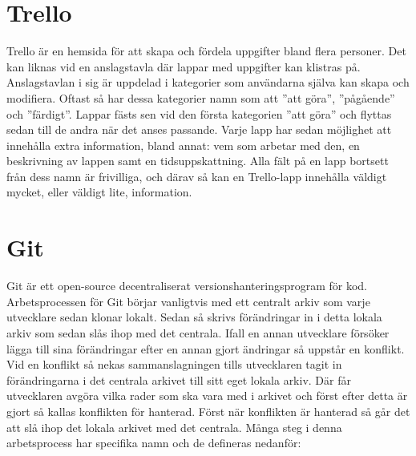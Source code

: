 \section{Trello}
Trello är en hemsida för att skapa och fördela uppgifter bland flera personer.\cite{Trello} Det kan liknas vid en anslagstavla där lappar med uppgifter kan klistras på. Anslagstavlan i sig är uppdelad i kategorier som användarna själva kan skapa och modifiera. Oftast så har dessa kategorier namn som att ''att göra'', ''pågående'' och ''färdigt''. Lappar fästs sen vid den första kategorien ''att göra'' och flyttas sedan till de andra när det anses passande. Varje lapp har sedan möjlighet att innehålla extra information, bland annat: vem som arbetar med den, en beskrivning av lappen samt en tidsuppskattning. Alla fält på en lapp bortsett från dess namn är frivilliga, och därav så kan en Trello-lapp innehålla väldigt mycket, eller väldigt lite, information.

\section{Git}
Git är ett open-source decentraliserat versionshanteringsprogram för kod.\cite{Git} Arbetsprocessen för Git börjar vanligtvis med ett centralt arkiv som varje utvecklare sedan klonar lokalt. Sedan så skrivs förändringar in i detta lokala arkiv som sedan slås ihop med det centrala. Ifall en annan utvecklare försöker lägga till sina förändringar efter en annan gjort ändringar så uppstår en konflikt. Vid en konflikt så nekas sammanslagningen tills utvecklaren tagit in förändringarna i det centrala arkivet till sitt eget lokala arkiv. Där får utvecklaren avgöra vilka rader som ska vara med i arkivet och först efter detta är gjort så kallas konflikten för hanterad. Först när konflikten är hanterad så går det att slå ihop det lokala arkivet med det centrala. Många steg i denna arbetsprocess har specifika namn och de defineras nedanför:

